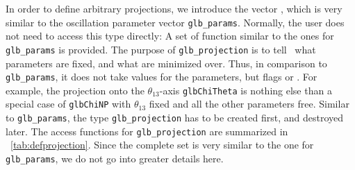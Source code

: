 In order to define arbitrary projections, we introduce the vector
, which is very similar to the
oscillation parameter vector {\tt glb\_params}.
Normally, the user does not need to access this type directly:
A set of function similar to the ones for {\tt glb\_params} is
provided. The purpose of {\tt glb\_projection} is to tell \GLOBES\ 
what parameters are fixed, and what are minimized over. Thus, in
comparison to {\tt glb\_params}, it does not take values for the
parameters, but flags \GLB{GLB\_FIXED} or \GLB{GLB\_FREE}.
For example, the projection onto the $\theta_{13}$-axis {\tt glbChiTheta}
is nothing else than a special case of {\tt glbChiNP} with $\theta_{13}$
fixed and all the other parameters free. Similar to {\tt glb\_params},
the type {\tt glb\_projection} has to be created first, and destroyed
later. The access functions for {\tt glb\_projection} are summarized in \Tab~\ref{tab:defprojection}. Since the complete set is very similar to
the one for {\tt glb\_params}, we do not go into greater details here.

